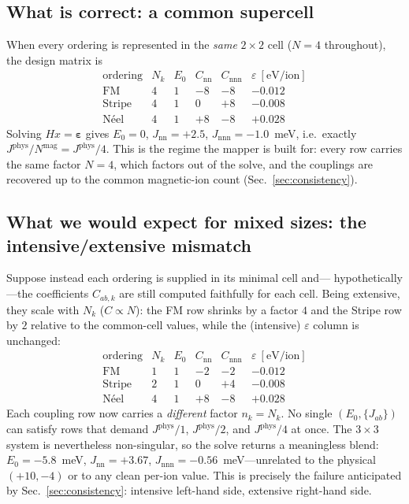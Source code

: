 \documentclass[11pt]{article}
\begin{document}
\subsection{What is correct: a common supercell}
When every ordering is represented in the \emph{same} $2\times2$ cell ($N=4$
throughout), the design matrix is
\begin{equation*}
\begin{array}{l|c|ccc|c}
\text{ordering} & N_k & E_0 & C_{\mathrm{nn}} & C_{\mathrm{nnn}} & \varepsilon~[\mathrm{eV/ion}]\\\hline
\text{FM}     & 4 & 1 & -8 & -8 & -0.012\\
\text{Stripe} & 4 & 1 &  0 & +8 & -0.008\\
\text{N\'eel} & 4 & 1 & +8 & -8 & +0.028
\end{array}
\end{equation*}
Solving $Hx=\boldsymbol\varepsilon$ gives $E_0=0$, $J_{\mathrm{nn}}=+2.5$,
$J_{\mathrm{nnn}}=-1.0$~meV, i.e.\ exactly
$J^{\mathrm{phys}}/N^{\mathrm{mag}}=J^{\mathrm{phys}}/4$. This is the regime the
mapper is built for: every row carries the same factor $N=4$, which factors out
of the solve, and the couplings are recovered up to the common magnetic-ion count
(Sec.~\ref{sec:consistency}).

\subsection{What we would expect for mixed sizes: the intensive/extensive
mismatch}
Suppose instead each ordering is supplied in its minimal cell and---%
hypothetically---the coefficients $C_{ab,k}$ are still computed faithfully for
each cell. Being extensive, they scale with $N_k$ ($C\propto N$): the FM row
shrinks by a factor $4$ and the Stripe row by $2$ relative to the common-cell
values, while the (intensive) $\varepsilon$ column is unchanged:
\begin{equation*}
\begin{array}{l|c|ccc|c}
\text{ordering} & N_k & E_0 & C_{\mathrm{nn}} & C_{\mathrm{nnn}} & \varepsilon~[\mathrm{eV/ion}]\\\hline
\text{FM}     & 1 & 1 & -2 & -2 & -0.012\\
\text{Stripe} & 2 & 1 &  0 & +4 & -0.008\\
\text{N\'eel} & 4 & 1 & +8 & -8 & +0.028
\end{array}
\end{equation*}
Each coupling row now carries a \emph{different} factor $n_k=N_k$. No single
$(E_0,\{J_{ab}\})$ can satisfy rows that demand $J^{\mathrm{phys}}/1$,
$J^{\mathrm{phys}}/2$, and $J^{\mathrm{phys}}/4$ at once. The $3\times3$ system is
nevertheless non-singular, so the solve returns a meaningless blend:
$E_0=-5.8$~meV, $J_{\mathrm{nn}}=+3.67$, $J_{\mathrm{nnn}}=-0.56$~meV---unrelated
to the physical $(+10,-4)$ or to any clean per-ion value. This is precisely the
failure anticipated by Sec.~\ref{sec:consistency}: intensive left-hand side,
extensive right-hand side.
\end{document}
